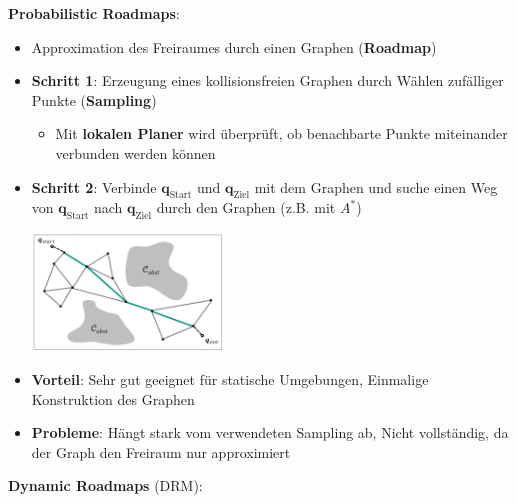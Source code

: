\textbf{Probabilistic Roadmaps}:
\begin{itemize}
	\item Approximation des Freiraumes durch einen Graphen (\textbf{Roadmap})
	\item \textbf{Schritt 1}: Erzeugung eines kollisionsfreien Graphen durch Wählen zufälliger Punkte (\textbf{Sampling})
	\begin{itemize}
		\item Mit \textbf{lokalen Planer} wird überprüft, ob benachbarte Punkte miteinander verbunden werden können
	\end{itemize}
	\item \textbf{Schritt 2}: Verbinde $\mathbf{q}_\text{Start}$ und  $\mathbf{q}_\text{Ziel}$ mit dem Graphen und suche einen Weg von $\mathbf{q}_\text{Start}$ nach $\mathbf{q}_\text{Ziel}$ durch den Graphen (z.B. mit $A^*$)
	\begin{center}
		\includegraphics[width=0.4\textwidth]{images/prm.png}
	\end{center}
	\item \textbf{Vorteil}: Sehr gut geeignet für statische Umgebungen, Einmalige Konstruktion des Graphen
	\item \textbf{Probleme}: Hängt stark vom verwendeten Sampling ab, Nicht vollständig, da der Graph den Freiraum nur approximiert
\end{itemize}
\bigskip
\textbf{Dynamic Roadmaps} (DRM):
